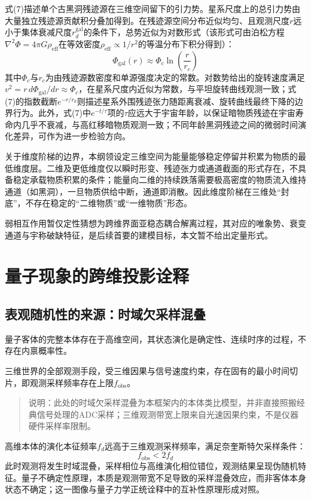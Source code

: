 \documentclass[UTF8]{csoarticle}
\begin{document}
式(7)描述单个古黑洞残迹源在三维空间留下的引力势。星系尺度上的总引力势由大量独立残迹源贡献积分叠加得到。在残迹源空间分布近似均匀、且观测尺度$r$远小于集体衰减尺度$r_d^{\text{gal}}$的条件下，总势近似为对数形式（该形式可由泊松方程$\nabla^2\Phi=4\pi G\rho_{\text{eff}}$在等效密度$\rho_{\text{eff}}\propto 1/r^2$的等温分布下积分得到）：
\begin{equation*}
\Phi_{\text{gal}}(r) \approx \Phi_c \ln\left(\frac{r}{r_c}\right)
\tag{7b}
\end{equation*}
其中$\Phi_c$与$r_c$为由残迹源数密度和单源强度决定的常数。对数势给出的旋转速度满足$v^2 = r \, d\Phi_{\text{gal}}/dr \approx \Phi_c$，在星系尺度内近似为常数，与平坦旋转曲线观测一致；式(7)的指数截断$e^{-r/r_d}$则描述星系外围残迹张力随距离衰减、旋转曲线最终下降的边界行为。此外，式(7)中$e^{-t/\tau}$项的$\tau$应远大于宇宙年龄，以保证暗物质残迹在宇宙寿命内几乎不衰减，与高红移暗物质观测一致；不同年龄黑洞残迹之间的微弱时间演化差异，可作为进一步检验方向。

关于维度阶梯的边界，本纲领设定三维空间为能量能够稳定停留并积累为物质的最低维度层。二维及更低维度仅以瞬时形变、残迹张力或通道截面的形式存在，不具备稳定承载物质积累的条件；能量向二维的持续跌落需要极高密度的物质流入维持通道（如黑洞），一旦物质供给中断，通道即消散。因此维度阶梯在三维处“封底”，不存在稳定的“二维物质”或“一维物质”形态。

弱相互作用暂仅定性猜想为跨维界面亚稳态耦合解离过程，其对应的唯象势、衰变通道与宇称破缺特征，是后续首要的建模目标，本文暂不给出定量形式。

\section{量子现象的跨维投影诠释}
\subsection{表观随机性的来源：时域欠采样混叠}
量子客体的完整本体存在于高维空间，其状态演化是确定性、连续时序的过程，不存在内禀概率性。

三维世界的全部观测手段，受三维因果与信号速度约束，存在固有的最小时间切片，即观测采样频率存在上限$f_{\text{obs}}$。
\begin{quote}
说明：此处的时域欠采样混叠为本框架内的本体类比模型，并非直接照搬经典信号处理的ADC采样；三维观测带宽上限来自光速因果约束，不是仪器硬件采样率限制。
\end{quote}
高维本体的演化本征频率$f_d$远高于三维观测采样频率，满足奈奎斯特欠采样条件：
\begin{equation}
f_{\text{obs}} < 2 f_d
\end{equation}
此时观测将发生时域混叠，采样相位与高维演化相位错位，观测结果呈现伪随机特征。量子不确定性原理，本质是观测带宽不足导致的采样混叠效应，而非客体本身状态不确定；这一图像与量子力学正统诠释中的互补性原理形成对照。
\end{document}
